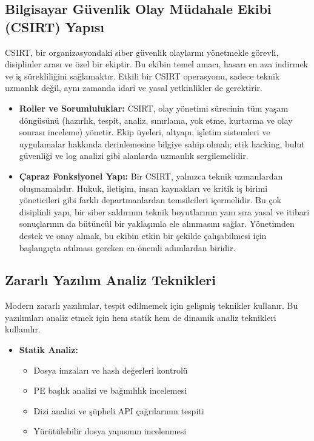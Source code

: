 \begin{itemize}
\begin{itemize}
\subsection{Bilgisayar Güvenlik Olay Müdahale Ekibi (CSIRT) Yapısı}

CSIRT, bir organizasyondaki siber güvenlik olaylarını yönetmekle görevli, disiplinler arası ve özel bir ekiptir. Bu ekibin temel amacı, hasarı en aza indirmek ve iş sürekliliğini sağlamaktır. Etkili bir CSIRT operasyonu, sadece teknik uzmanlık değil, aynı zamanda idari ve yasal yetkinlikler de gerektirir.

\begin{itemize}
    \item \textbf{Roller ve Sorumluluklar:} CSIRT, olay yönetimi sürecinin tüm yaşam döngüsünü (hazırlık, tespit, analiz, sınırlama, yok etme, kurtarma ve olay sonrası inceleme) yönetir. Ekip üyeleri, altyapı, işletim sistemleri ve uygulamalar hakkında derinlemesine bilgiye sahip olmalı; etik hacking, bulut güvenliği ve log analizi gibi alanlarda uzmanlık sergilemelidir.

    \item \textbf{Çapraz Fonksiyonel Yapı:} Bir CSIRT, yalnızca teknik uzmanlardan oluşmamalıdır. Hukuk, iletişim, insan kaynakları ve kritik iş birimi yöneticileri gibi farklı departmanlardan temsilcileri içermelidir. Bu çok disiplinli yapı, bir siber saldırının teknik boyutlarının yanı sıra yasal ve itibari sonuçlarının da bütüncül bir yaklaşımla ele alınmasını sağlar. Yönetimden destek ve onay almak, bu ekibin etkin bir şekilde çalışabilmesi için başlangıçta atılması gereken en önemli adımlardan biridir.
\end{itemize}

\subsection{Zararlı Yazılım Analiz Teknikleri}

Modern zararlı yazılımlar, tespit edilmemek için gelişmiş teknikler kullanır. Bu yazılımları analiz etmek için hem statik hem de dinamik analiz teknikleri kullanılır.

\begin{itemize}
    \item \textbf{Statik Analiz:}
    \begin{itemize}
        \item Dosya imzaları ve hash değerleri kontrolü
        \item PE başlık analizi ve bağımlılık incelemesi
        \item Dizi analizi ve şüpheli API çağrılarının tespiti
        \item Yürütülebilir dosya yapısının incelenmesi
    \end{itemize}
\end{itemize}


\end{itemize}
\end{itemize}
